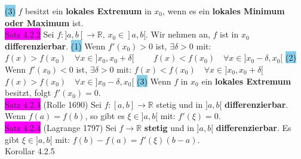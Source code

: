 \documentclass[landscape, 10pt]{article}
\newcommand{\R}{\mathbb{R}}
\begin{document}
\begin{multicols}{3}
                     \colorbox{SkyBlue}{(3)} $f$ besitzt ein \textbf{lokales Extremum} 
                     in \textcolor{NavyBlue}{$x_0$}, wenn es ein 
                     \textbf{lokales Minimum oder Maximum} ist. \\
              \colorbox{magenta}{Satz 4.2.2} 
                     Sei \textcolor{NavyBlue}{
                     $f:]a,b[\longrightarrow\R,\,x_0\in]a,b[$}. 
                     Wir nehmen an, \textcolor{NavyBlue}{$f$} ist in 
                     \textcolor{NavyBlue}{$x_0$} \textbf{differenzierbar}.
                     \colorbox{SkyBlue}{(1)} Wenn \textcolor{NavyBlue}{$f'(x_0)>0$} 
                     ist, \textcolor{NavyBlue}{$\exists\delta>0$} mit: 
                     \textcolor{NavyBlue}{
                     $f(x)>f(x_0)\quad\forall x\in]x_0,x_0+\delta[\qquad$}
                     \textcolor{NavyBlue}{
                     $f(x)<f(x_0)\quad\forall x\in]x_0-\delta,x_0[$} 
                     \colorbox{SkyBlue}{(2)} Wenn 
                     \textcolor{NavyBlue}{$f'(x_0)<0$} ist, 
                     \textcolor{NavyBlue}{$\exists\delta>0$} mit: 
                     \textcolor{NavyBlue}{
                     $f(x)<f(x_0)\quad\forall x\in]x_0,x_0+\delta[\qquad$}
                     \textcolor{NavyBlue}{
                     $f(x)>f(x_0)\quad\forall x\in]x_0-\delta,x_0[$} 
                     \colorbox{SkyBlue}{(3)} Wenn \textcolor{NavyBlue}{$f$} in 
                     \textcolor{NavyBlue}{$x_0$} ein \textbf{lokales Extremum} 
                     besitzt, folgt \textcolor{NavyBlue}{$f'(x_0)=0$}.\\
              \colorbox{magenta}{Satz 4.2.3} 
              (Rolle 1690) 
                     Sei \textcolor{NavyBlue}{$f:[a,b]\longrightarrow\R$}
                     stetig und in \textcolor{NavyBlue}{$]a,b[$} 
                     \textbf{differenzierbar}. 
                     Wenn \textcolor{NavyBlue}{$f(a)=f(b)$}, so gibt es 
                     \textcolor{NavyBlue}{$\xi\in]a,b[$} mit: 
                     \textcolor{NavyBlue}{$f'(\xi)=0$}.\\
              \colorbox{magenta}{Satz 4.2.4}
              (Lagrange 1797) 
                     Sei \textcolor{NavyBlue}{$f\longrightarrow\R$}
                     \textbf{stetig} und in \textcolor{NavyBlue}{$]a,b[$} 
                     \textbf{differenzierbar}. 
                     Es gibt \textcolor{NavyBlue}{$\xi\in]a,b[$} mit: 
                     \textcolor{NavyBlue}{$f(b)-f(a)=f'(\xi)(b-a)$}.\\
              \colorbox{BurntOrange}{Korollar 4.2.5} 

\end{multicols}
\end{document}
